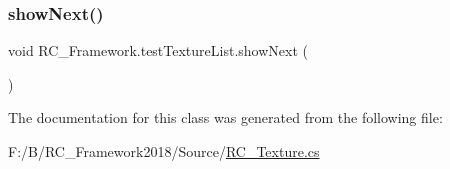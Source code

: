 \subsubsection{\texorpdfstring{show\+Next()}{showNext()}}
{\footnotesize\ttfamily void R\+C\+\_\+\+Framework.\+test\+Texture\+List.\+show\+Next (\begin{DoxyParamCaption}{ }\end{DoxyParamCaption})}



The documentation for this class was generated from the following file\+:\begin{DoxyCompactItemize}
\item 
F\+:/\+B/\+R\+C\+\_\+\+Framework2018/\+Source/\mbox{\hyperlink{_r_c___texture_8cs}{R\+C\+\_\+\+Texture.\+cs}}\end{DoxyCompactItemize}
